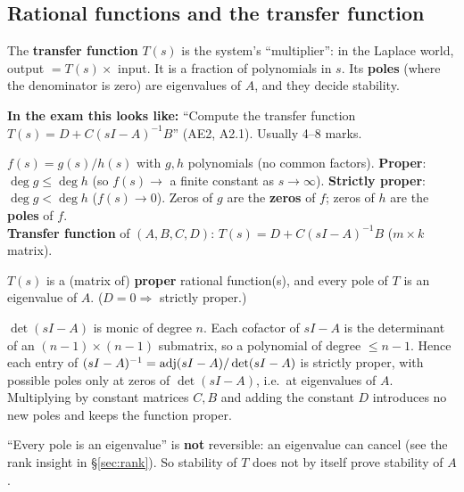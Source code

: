 \subsection{Rational functions and the transfer function \texorpdfstring{}{}}\label{sec:tf}\label{ss:2-9}
\begin{plainbox}
The \textbf{transfer function} $T(s)$ is the system's ``multiplier'': in the Laplace world, output $=T(s)\times$ input.
It is a fraction of polynomials in $s$. Its \textbf{poles} (where the denominator is zero) are eigenvalues of $A$, and they decide stability.
\par\smallskip\textbf{In the exam this looks like:} ``Compute the transfer function $T(s)=D+C(sI-A)^{-1}B$'' (AE2, A2.1). Usually 4--8 marks.
\end{plainbox}
\begin{defbox}
$f(s)=g(s)/h(s)$ with $g,h$ polynomials (no common factors).
\textbf{Proper}: $\deg g\le\deg h$ (so $f(s)\to$ a finite constant as $s\to\infty$). \textbf{Strictly proper}: $\deg g<\deg h$ ($f(s)\to0$).
Zeros of $g$ are the \textbf{zeros} of $f$; zeros of $h$ are the \textbf{poles} of $f$.\\
\textbf{Transfer function} of $(A,B,C,D)$: $\boxed{T(s)=D+C(sI-A)^{-1}B}$ ($m\times k$ matrix).
\end{defbox}
\begin{thmbox}[title={Proposition 0.20 / Corollary 0.21}]
$T(s)$ is a (matrix of) \textbf{proper} rational function(s), and every pole of $T$ is an eigenvalue of $A$. ($D=0\Rightarrow$ strictly proper.)
\end{thmbox}
\begin{proofbox}[title={Proof of Proposition 0.20}]
$\det(sI-A)$ is monic of degree $n$. Each cofactor of $sI-A$ is the determinant of an $(n-1)\times(n-1)$ submatrix, so a polynomial of degree $\le n-1$.
Hence each entry of $(sI-A)^{-1}=\operatorname{adj}(sI-A)/\det(sI-A)$ is strictly proper, with possible poles only at zeros of $\det(sI-A)$, i.e.\ at eigenvalues of $A$.
Multiplying by constant matrices $C,B$ and adding the constant $D$ introduces no new poles and keeps the function proper.
\end{proofbox}
\begin{warnbox}
``Every pole is an eigenvalue'' is \textbf{not} reversible: an eigenvalue can cancel (see the rank insight in \S\ref{sec:rank}). So stability of $T$ does not by itself prove stability of $A$.
\end{warnbox}

